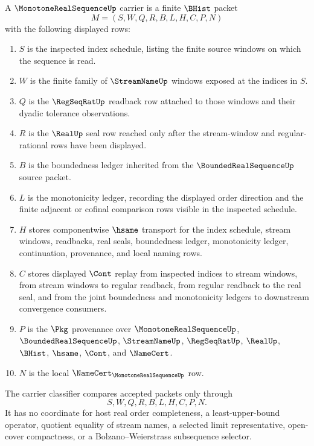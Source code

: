 \begin{definition}
\label{def:monotone-real-sequence-carrier}
A $\MonotoneRealSequenceUp$ carrier is a finite $\BHist$ packet
$$
M=(S,W,Q,R,B,L,H,C,P,N)
$$
with the following displayed rows:
\begin{enumerate}
\item $S$ is the inspected index schedule, listing the finite source windows on which the sequence is read.
\item $W$ is the finite family of $\StreamNameUp$ windows exposed at the indices in $S$.
\item $Q$ is the $\RegSeqRatUp$ readback row attached to those windows and their dyadic tolerance observations.
\item $R$ is the $\RealUp$ seal row reached only after the stream-window and regular-rational rows have been displayed.
\item $B$ is the boundedness ledger inherited from the $\BoundedRealSequenceUp$ source packet.
\item $L$ is the monotonicity ledger, recording the displayed order direction and the finite adjacent or cofinal comparison rows visible in the inspected schedule.
\item $H$ stores componentwise $\hsame$ transport for the index schedule, stream windows, readbacks, real seals, boundedness ledger, monotonicity ledger, continuation, provenance, and local naming rows.
\item $C$ stores displayed $\Cont$ replay from inspected indices to stream windows, from stream windows to regular readback, from regular readback to the real seal, and from the joint boundedness and monotonicity ledgers to downstream convergence consumers.
\item $P$ is the $\Pkg$ provenance over $\MonotoneRealSequenceUp$, $\BoundedRealSequenceUp$, $\StreamNameUp$, $\RegSeqRatUp$, $\RealUp$, $\BHist$, $\hsame$, $\Cont$, and $\NameCert$.
\item $N$ is the local $\NameCert_{\MonotoneRealSequenceUp}$ row.
\end{enumerate}
The carrier classifier compares accepted packets only through
$$
S,W,Q,R,B,L,H,C,P,N.
$$
It has no coordinate for host real order completeness, a least-upper-bound operator, quotient equality of stream names, a selected limit representative, open-cover compactness, or a Bolzano--Weierstrass subsequence selector.
\end{definition}

